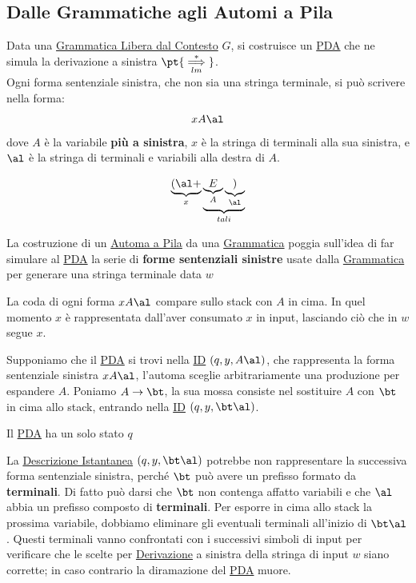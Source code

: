 \subsection{Dalle Grammatiche agli Automi a Pila}\label{sub:ll_dalle_grammatiche_agli_automi_a_pila} %
Data una \hyperref[sec:ll_grammatiche_libere_dal_contesto]{Grammatica Libera dal Contesto} $G$, si costruisce un \hyperref[def:pda]{PDA} che ne simula la derivazione a sinistra $\pt{\overset{*}{\underset{lm}{\implies}}}$.
\\
Ogni forma sentenziale sinistra, che non sia una stringa terminale, si può scrivere nella forma:
\[
    xA\al
\]
dove $A$ è la variabile \textbf{più a sinistra}, $x$ è la stringa di terminali alla sua sinistra, e $\al$ è la stringa di terminali e variabili alla destra di $A$.
\begin{example}{}{}
    \[
        \underbrace{(\al + }_{x}\underbrace{\underbrace{E}_{A}\underbrace{)}_{\al}}_{tali}
    \]
\end{example}
\begin{tip}
    La costruzione di un \hyperref[def:pda]{Automa a Pila} da una \hyperref[def:cfg]{Grammatica} poggia sull'idea di far simulare al \hyperref[def:pda]{PDA} la serie di \textbf{forme sentenziali sinistre} usate dalla \hyperref[def:cfg]{Grammatica} per generare una stringa terminale data $w$
\end{tip}
La coda di ogni forma $xA\al$ compare sullo stack con $A$ in cima.
In quel momento $x$ è rappresentata dall'aver consumato $x$ in input, lasciando ciò che in $w$ segue $x$.
\begin{note}[Quindi se $w = xy$ allora in input rimane $y$]
\end{note}
\begin{remark}{}{}
    Supponiamo che il \hyperref[def:pda]{PDA} si trovi nella \hyperref[def:desc-inst]{ID} $(q,y,A\al)$, che rappresenta la forma sentenziale sinistra $xA\al$, l'automa sceglie arbitrariamente una produzione per espandere $A$.
    Poniamo $A\to \bt$, la sua mossa consiste nel sostituire $A$ con $\bt$ in cima allo stack, entrando nella \hyperref[def:desc-inst]{ID} $(q,y,\bt\al)$.
    \begin{note}
        Il \hyperref[def:pda]{PDA} ha un solo stato $q$
    \end{note}
    La \hyperref[def:desc-inst]{Descrizione Istantanea} $(q,y,\bt\al)$ potrebbe non rappresentare la successiva forma sentenziale sinistra, perché $\bt$ può avere un prefisso formato da \textbf{terminali}.
    Di fatto può darsi che $\bt$ non contenga affatto variabili e che $\al$ abbia un prefisso composto di \textbf{terminali}.
    \emptyln{}
    Per esporre in cima allo stack la prossima variabile, dobbiamo eliminare gli eventuali terminali all'inizio di $\bt\al$.
    Questi terminali vanno confrontati con i successivi simboli di input per verificare che le scelte per \hyperref[rem:gram-derivazione]{Derivazione} a sinistra della stringa di input $w$ siano corrette; in caso contrario la diramazione del \hyperref[def:pda]{PDA} muore.
\end{remark}
